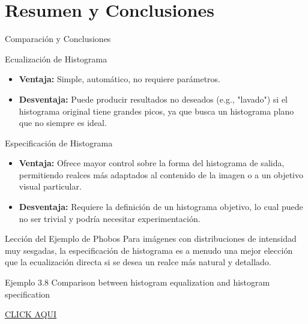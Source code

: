 \documentclass{beamer}
\begin{document}
\section{Resumen y Conclusiones}

\begin{frame}{Comparación y Conclusiones}\footnotesize
    \begin{block}{Ecualización de Histograma}
        \begin{itemize}
            \item \textbf{Ventaja:} Simple, automático, no requiere parámetros.
            \item \textbf{Desventaja:} Puede producir resultados no deseados (e.g., "lavado") si el histograma original tiene grandes picos, ya que busca un histograma plano que no siempre es ideal.
        \end{itemize}
    \end{block}
    \pause
    \begin{alertblock}{Especificación de Histograma}
        \begin{itemize}
            \item \textbf{Ventaja:} Ofrece mayor control sobre la forma del histograma de salida, permitiendo realces más adaptados al contenido de la imagen o a un objetivo visual particular.
            \item \textbf{Desventaja:} Requiere la definición de un histograma objetivo, lo cual puede no ser trivial y podría necesitar experimentación.
        \end{itemize}
    \end{alertblock}
    \pause
    \begin{exampleblock}{Lección del Ejemplo de Phobos}
        Para imágenes con distribuciones de intensidad muy sesgadas, la especificación de histograma es a menudo una mejor elección que la ecualización directa si se desea un realce más natural y detallado.
    \end{exampleblock}
\end{frame}


\begin{frame}[fragile]{Ejemplo 3.8 Comparison between histogram equalization and histogram specification}

\href{Ejemplo_3_8_p1.html}{CLICK AQUI}

\end{frame}
\end{document}

